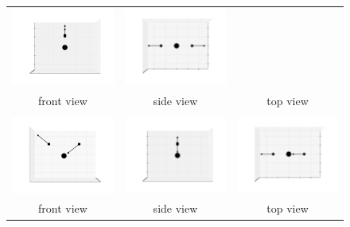 \documentclass[11pt]{article}
\begin{document}
\begin{figure}[htp]
\begin{tabular}{|ccc|}
	\includegraphics[width=5.5cm,clip=true,trim=3cm 2cm 3cm 2cm]{images/0-90_7.pdf}&
	\includegraphics[width=5.5cm,clip=true,trim=3cm 2cm 3cm 2cm]{images/90-0_7.pdf}\\front view&side view&top view\\\hline&&\\
	\includegraphics[width=5.5cm,clip=true,trim=3cm 2cm 3cm 2cm]{images/0-0_8.pdf}&
	\includegraphics[width=5.5cm,clip=true,trim=3cm 2cm 3cm 2cm]{images/0-90_8.pdf}&
	\includegraphics[width=5.5cm,clip=true,trim=3cm 2cm 3cm 2cm]{images/90-0_8.pdf}\\front view&side view&top view\\\hline
	\end{tabular}
\end{figure}
\end{document}
